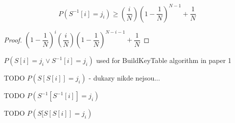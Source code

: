 \begin{thm}
	\[	P(S^{-1}[i] = j_{i}) \geq (\dfrac{i}{N})(1-\dfrac{1}{N})^{N-1}+ \dfrac{1}{N}\]
\end{thm}


\begin{proof}
		$ (1-\dfrac{1}{N})^{i}(\dfrac{i}{N})(1-\dfrac{1}{N})^{N-i-1}+ \dfrac{1}{N} $
\end{proof}

\begin{thm}
	$ P(S[i] = j_{i} \vee S^{-1}[i] = j_{i}) $ used for BuildKeyTable algorithm in paper 1
\end{thm}


TODO $ P(S[S[i]] = j_{i}) $ - dukazy nikde nejsou...

TODO $ P(S^{-1}[S^{-1}[i]] = j_{i}) $

TODO $ P(S[S[S[i]] = j_{i}) $




